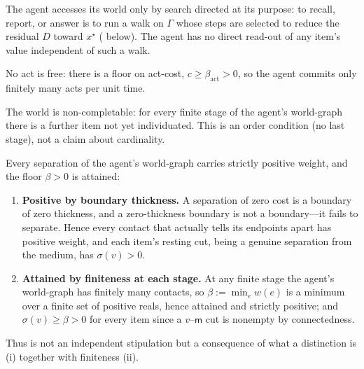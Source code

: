 \documentclass[11pt,twocolumn,a4paper]{article}
\newcommand{\Gph}{\Gamma}
\newcommand{\wt}{w}
\newcommand{\med}{\mathsf{m}}
\newcommand{\flo}{\beta}
\newcommand{\str}{\sigma}
\newcommand{\Purp}{x^{\star}}
\newcommand{\cost}{c}
\newcommand{\dem}{D}
\begin{document}
\begin{axiom}
\label{ax:purpsearch}
The agent accesses its world only by search directed at its purpose: to
recall, report, or answer is to run a walk on $\Gph$ whose steps are
selected to reduce the residual $\dem$ toward $\Purp$
( below). The agent has no direct read-out of any
item's value independent of such a walk.
\end{axiom}

\begin{axiom}
\label{ax:actfloor}
No act is free: there is a floor on act-cost, $\cost\ge\flo_{\mathrm{act}}
>0$, so the agent commits only finitely many acts per unit time.
\end{axiom}

\begin{axiom}
\label{ax:noncompletable}
The world is non-completable: for every finite stage of the agent's
world-graph there is a further item not yet individuated. This is an order
condition (no last stage), not a claim about cardinality.
\end{axiom}

\begin{theorem}
\label{thm:floorforced}
Every separation of the agent's world-graph carries strictly positive
weight, and the floor $\flo>0$ is attained:
\begin{enumerate}[label=\textup{(\roman*)},leftmargin=2.2em]
\item \textbf{Positive by boundary thickness.} A separation of zero cost is
a boundary of zero thickness, and a zero-thickness boundary is not a
boundary---it fails to separate. Hence every contact that actually tells its
endpoints apart has positive weight, and each item's resting cut, being a
genuine separation from the medium, has $\str(v)>0$.
\item \textbf{Attained by finiteness at each stage.} At any finite stage the
agent's world-graph has finitely many contacts, so
$\flo:=\min_{e}\wt(e)$ is a minimum over a finite set of positive reals,
hence attained and strictly positive; and $\str(v)\ge\flo>0$ for every item
since a $v$--$\med$ cut is nonempty by connectedness.
\end{enumerate}
Thus  is not an independent stipulation but a
consequence of what a distinction is (i) together with finiteness (ii).
\end{theorem}
\end{document}
